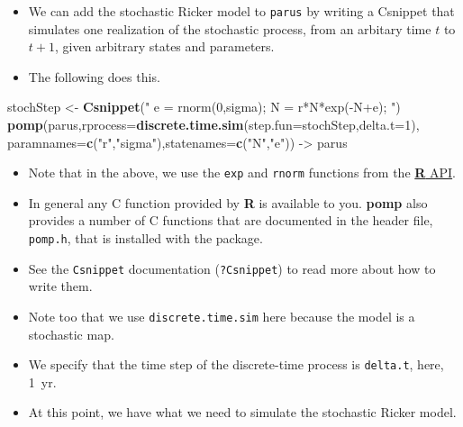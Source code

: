 \documentclass[]{article}
\newenvironment{Shaded}{\begin{snugshade}}{\end{snugshade}}
\newcommand{\KeywordTok}[1]{\textcolor[rgb]{0.13,0.29,0.53}{\textbf{#1}}}
\newcommand{\DataTypeTok}[1]{\textcolor[rgb]{0.13,0.29,0.53}{#1}}
\newcommand{\DecValTok}[1]{\textcolor[rgb]{0.00,0.00,0.81}{#1}}
\newcommand{\StringTok}[1]{\textcolor[rgb]{0.31,0.60,0.02}{#1}}
\newcommand{\NormalTok}[1]{#1}
\begin{document}
\begin{itemize}
\item
  We can add the stochastic Ricker model to \texttt{parus} by writing a
  Csnippet that simulates one realization of the stochastic process,
  from an arbitary time \(t\) to \(t+1\), given arbitrary states and
  parameters.
\item
  The following does this.
\end{itemize}

\begin{Shaded}
\begin{Highlighting}[]
\NormalTok{stochStep <-}\StringTok{ }\KeywordTok{Csnippet}\NormalTok{(}\StringTok{"}
\StringTok{  e = rnorm(0,sigma);}
\StringTok{  N = r*N*exp(-N+e);}
\StringTok{"}\NormalTok{)}
\KeywordTok{pomp}\NormalTok{(parus,}\DataTypeTok{rprocess=}\KeywordTok{discrete.time.sim}\NormalTok{(}\DataTypeTok{step.fun=}\NormalTok{stochStep,}\DataTypeTok{delta.t=}\DecValTok{1}\NormalTok{),}
     \DataTypeTok{paramnames=}\KeywordTok{c}\NormalTok{(}\StringTok{"r"}\NormalTok{,}\StringTok{"sigma"}\NormalTok{),}\DataTypeTok{statenames=}\KeywordTok{c}\NormalTok{(}\StringTok{"N"}\NormalTok{,}\StringTok{"e"}\NormalTok{)) ->}\StringTok{ }\NormalTok{parus}
\end{Highlighting}
\end{Shaded}

\begin{itemize}
\item
  Note that in the above, we use the \texttt{exp} and \texttt{rnorm}
  functions from the
  \href{https://cran.r-project.org/doc/manuals/r-release/R-exts.html\#The-R-API}{\textbf{R}
  API}.
\item
  In general any C function provided by \textbf{R} is available to you.
  \textbf{pomp} also provides a number of C functions that are
  documented in the header file, \texttt{pomp.h}, that is installed with
  the package.
\item
  See the \texttt{Csnippet} documentation (\texttt{?Csnippet}) to read
  more about how to write them.
\item
  Note too that we use \texttt{discrete.time.sim} here because the model
  is a stochastic map.
\item
  We specify that the time step of the discrete-time process is
  \texttt{delta.t}, here, 1~yr.
\item
  At this point, we have what we need to simulate the stochastic Ricker
  model.
\end{itemize}
\end{document}
